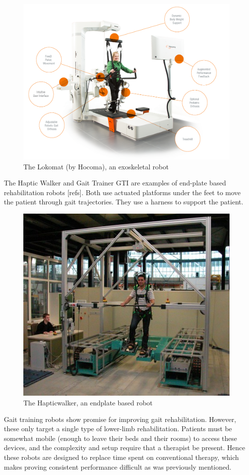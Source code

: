 \documentclass[12pt]{report}
\begin{document}
	
	\begin{figure}[t] 
		\centering
		\includegraphics[width=0.75\linewidth]{Lokomat}
		\caption{The Lokomat (by Hocoma), an exoskeletal robot}
		\label{fig:Lokomat}
	\end{figure}
	
	The Haptic Walker and Gait Trainer GTI are examples of end-plate based rehabilitation robots [refs]. Both use actuated platforms under the feet to move the patient through gait trajectories. They use a harness to support the patient. 
	
	\begin{figure}[t] 
		\centering
		\includegraphics[width=0.75\linewidth]{Hapticwalker}
		\caption{The Hapticwalker, an endplate based robot}
		\label{fig:Hapticwalker}
	\end{figure}
	
	
	Gait training robots show promise for improving gait rehabilitation. However, these only target a single type of lower-limb rehabilitation. Patients must be somewhat mobile (enough to leave their beds and their rooms) to access these devices, and the complexity and setup require that a therapist be present. Hence these robots are designed to replace time spent on conventional therapy, which makes proving consistent performance difficult as was previously mentioned.  
	
\end{document}
